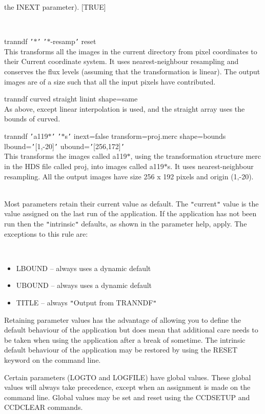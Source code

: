 \documentclass[twoside,11pt]{article}
\newcommand{\htmlref}[2]{#1}
\renewcommand{\_}{\texttt{\symbol{95}}}
\newcommand{\qt}[1]{{\tt "}#1{\tt "}}
\newcommand{\qs}[1]{{\tt '}#1{\tt '}}
\newcommand{\xroutine}[1]{\htmlref{{\sc #1}}{#1}}
\newcommand{\sstexamples}[1]{
   \item[Examples:] \mbox{} \\
   \vspace{-3.5ex}
   \begin{description}
      #1
   \end{description}
}
\newcommand{\sstexamplesubsection}[2]{\sloppy \item{\ssttt #1} \mbox{} \\ #2 }
\newcommand{\sstdiytopic}[2]{\item[#1:] \mbox{} \\[1.3ex] #2}
\newcommand{\sstimplementationstatus}[1]{
   \item[{Implementation Status:}] \mbox{} \\[1.3ex] #1}
\newcommand{\sstitemlist}[1]{
  \mbox{} \\
  \vspace{-3.5ex}
  \begin{itemize}
     #1
  \end{itemize}
}
\newcommand{\sstitem}{\item}
\newcommand{\sstexamples}[1]{
      \item[Examples:] \\
      \begin{description}
         #1
      \end{description}
      \\
   }
\newcommand{\sstexamplesubsection}[2]{\item[{\ssttt #1}] #2}
\newcommand{\sstdiytopic}[2]{\item[{#1}] #2 }
\newcommand{\sstimplementationstatus}[1]{
      \item[Implementation Status:] #1
   }
\newcommand{\sstitemlist}[1]{
      \begin{itemize}
         #1
      \end{itemize}
      \\
   }
\newcommand{\sstitem}{\item}
\begin{document}
{{{         the INEXT parameter). [TRUE]
      }
   }
   \sstexamples{
      \sstexamplesubsection{
         tranndf \qs{$*$} \qs{$*$-resamp} reset
      }{
         This transforms all the images in the current directory from
         pixel coordinates to their Current coordinate system.
         It uses nearest-neighbour resampling and conserves the flux
         levels (assuming that the transformation is linear).
         The output images are of a size such that all the input
         pixels have contributed.
      }
      \sstexamplesubsection{
         tranndf curved straight linint shape=same
      }{
         As above, except linear interpolation is used, and the straight
         array uses the bounds of curved.
      }
      \sstexamplesubsection{
         tranndf \qs{a119$*$} \qs{$*$s} inext=false transform=proj.merc
            shape=bounds lbound=\qs{[1,-20]} ubound=\qs{[256,172]}
      }{
         This transforms the images called a119$*$, using the transformation
         structure merc in the HDS file called proj, into images called 
         a119$*$s.  It uses nearest-neighbour resampling.  All the output 
         images have size 256 x 192 pixels and origin (1,-20).
      }
   }
   \sstdiytopic{
      Behaviour of parameters
   }{
      Most parameters retain their current value as default. The
      \qt{current} value is the value assigned on the last run of the
      application. If the application has not been run then the
      \qt{intrinsic} defaults, as shown in the parameter help, apply.
      The exceptions to this rule are:
      \sstitemlist{

         \sstitem
            LBOUND  -- always uses a dynamic default

         \sstitem
            UBOUND  -- always uses a dynamic default

         \sstitem
            TITLE   -- always \qt{Output from TRANNDF}

      }
      Retaining parameter values has the advantage of allowing you to
      define the default behaviour of the application but does mean
      that additional care needs to be taken when using the application
      after a break of sometime. The intrinsic default behaviour of
      the application may be restored by using the RESET keyword on
      the command line.

      Certain parameters (LOGTO and LOGFILE) have global values. These
      global values will always take precedence, except when an
      assignment is made on the command line.  Global values may be set
      and reset using the \xroutine{CCDSETUP} and \xroutine{CCDCLEAR} commands.
   }
   \sstimplementationstatus{
      \sstitemlist{

}}}
\end{document}
